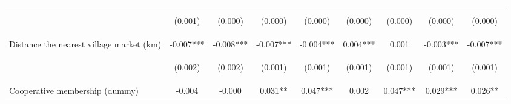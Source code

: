 \begin{center}
\begin{tabular}{lcccccccc}
\vspace{4pt} & \begin{footnotesize}(0.001)\end{footnotesize} & \begin{footnotesize}(0.000)\end{footnotesize} & \begin{footnotesize}(0.000)\end{footnotesize} & \begin{footnotesize}(0.000)\end{footnotesize} & \begin{footnotesize}(0.000)\end{footnotesize} & \begin{footnotesize}(0.000)\end{footnotesize} & \begin{footnotesize}(0.000)\end{footnotesize} & \begin{footnotesize}(0.000)\end{footnotesize} \\
Distance the nearest village market (km) & -0.007*** & -0.008*** & -0.007*** & -0.004*** & 0.004*** & 0.001 & -0.003*** & -0.007*** \\
\vspace{4pt} & \begin{footnotesize}(0.002)\end{footnotesize} & \begin{footnotesize}(0.002)\end{footnotesize} & \begin{footnotesize}(0.001)\end{footnotesize} & \begin{footnotesize}(0.001)\end{footnotesize} & \begin{footnotesize}(0.001)\end{footnotesize} & \begin{footnotesize}(0.001)\end{footnotesize} & \begin{footnotesize}(0.001)\end{footnotesize} & \begin{footnotesize}(0.001)\end{footnotesize} \\
Cooperative membership (dummy) & -0.004 & -0.000 & 0.031** & 0.047*** & 0.002 & 0.047*** & 0.029*** & 0.026** \\

\end{tabular}
\end{center}
